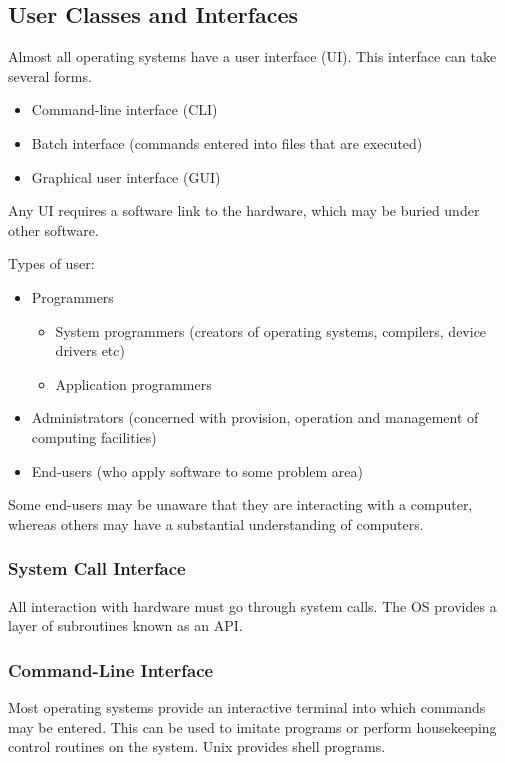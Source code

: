 \subsection{User Classes and Interfaces}

Almost all operating systems have a user interface (UI).
This interface can take several forms.
\begin{itemize}
  \item Command-line interface (CLI)
  \item Batch interface (commands entered into files that are executed)
  \item Graphical user interface (GUI)
\end{itemize}

Any UI requires a software link to the hardware, which may be buried under other software.

Types of user:
\begin{itemize}
  \item Programmers
  \begin{itemize}
    \item System programmers (creators of operating systems, compilers, device drivers etc)
    \item Application programmers
  \end{itemize}
  \item Administrators (concerned with provision, operation and management of computing facilities)
  \item End-users (who apply software to some problem area)
\end{itemize}

Some end-users may be unaware that they are interacting with a computer, whereas others may have a substantial understanding of computers.

\subsubsection{System Call Interface}

All interaction with hardware must go through system calls.
The OS provides a layer of subroutines known as an API.

\subsubsection{Command-Line Interface}

Most operating systems provide an interactive terminal into which commands may be entered.
This can be used to imitate programs or perform housekeeping control routines on the system.
Unix provides shell programs.


